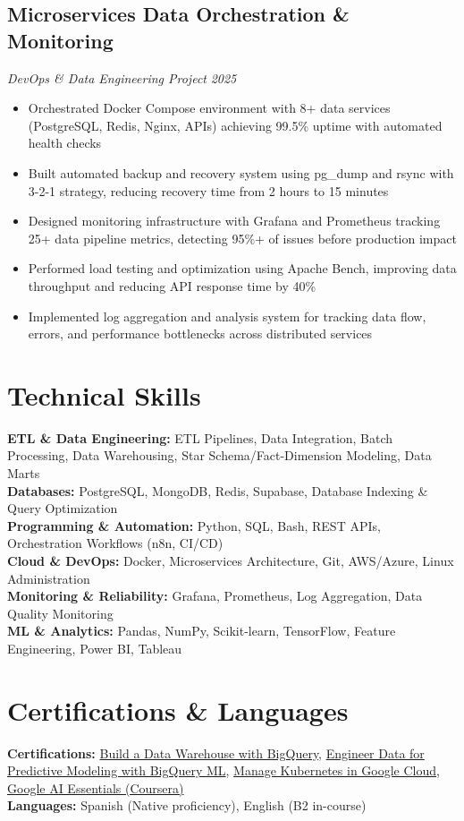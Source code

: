 \documentclass[7.5pt,a4paper]{article}
\newcommand{\project}[3]{
\subsection*{#1}
\textit{#2} \hfill \textit{#3}
}
\begin{document}
\project{Microservices Data Orchestration \& Monitoring}{DevOps \& Data Engineering Project}{2025}
\begin{itemize}
\item Orchestrated Docker Compose environment with 8+ data services (PostgreSQL, Redis, Nginx, APIs) achieving 99.5\% uptime with automated health checks
\item Built automated backup and recovery system using pg\_dump and rsync with 3-2-1 strategy, reducing recovery time from 2 hours to 15 minutes
\item Designed monitoring infrastructure with Grafana and Prometheus tracking 25+ data pipeline metrics, detecting 95\%+ of issues before production impact
\item Performed load testing and optimization using Apache Bench, improving data throughput and reducing API response time by 40\%
\item Implemented log aggregation and analysis system for tracking data flow, errors, and performance bottlenecks across distributed services
\end{itemize}

\section*{Technical Skills}
\textbf{ETL \& Data Engineering:} ETL Pipelines, Data Integration, Batch Processing, Data Warehousing, Star Schema/Fact-Dimension Modeling, Data Marts \\
\textbf{Databases:} PostgreSQL, MongoDB, Redis, Supabase, Database Indexing \& Query Optimization \\
\textbf{Programming \& Automation:} Python, SQL, Bash, REST APIs, Orchestration Workflows (n8n, CI/CD) \\
\textbf{Cloud \& DevOps:} Docker, Microservices Architecture, Git, AWS/Azure, Linux Administration \\
\textbf{Monitoring \& Reliability:} Grafana, Prometheus, Log Aggregation, Data Quality Monitoring \\
\textbf{ML \& Analytics:} Pandas, NumPy, Scikit-learn, TensorFlow, Feature Engineering, Power BI, Tableau

\section*{Certifications \& Languages}
\textbf{Certifications:} \href{https://www.credly.com/badges/c41430a1-de6e-4642-86e2-0d55dad94f18/public_url}{Build a Data Warehouse with BigQuery}, \href{https://www.credly.com/badges/18b87ad4-da02-4a37-a92e-f8e60fa53559/public_url}{Engineer Data for Predictive Modeling with BigQuery ML}, \href{https://www.credly.com/badges/5e7db262-4e11-41d3-8630-2b8c9c3458e3/public_url}{Manage Kubernetes in Google Cloud}, \href{https://www.credly.com/badges/1e3dfdbc-ec96-4e7c-a6e6-351eefae2390/public_url}{Google AI Essentials (Coursera)} \\
\textbf{Languages:} Spanish (Native proficiency), English (B2 in-course) 
\end{document}
